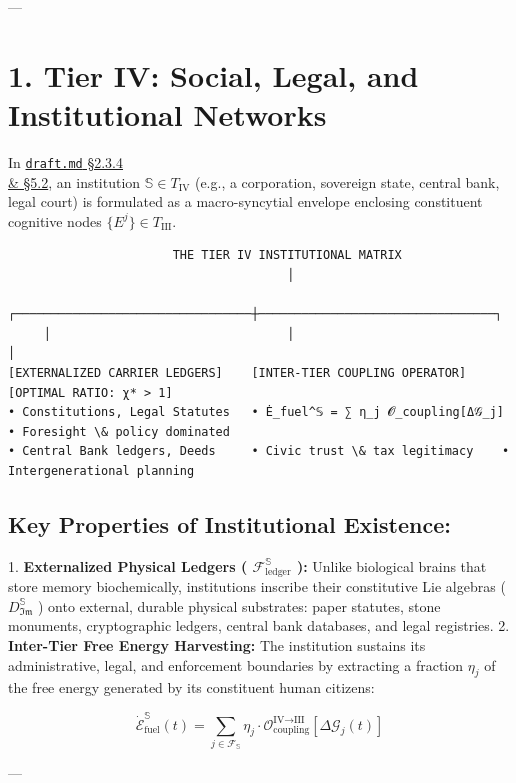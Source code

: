 \documentclass[11pt,a4paper]{article}
\theoremstyle{definition}
\theoremstyle{remark}
\begin{document}
---

\section{1. Tier IV: Social, Legal, and Institutional Networks}

In \href{../existence/draft.md}{\texttt{draft.md} \S 2.3.4 \\& \S 5.2}, an institution $\mathbb{S} \in T_{\text{IV}}$ (e.g., a corporation, sovereign state, central bank, legal court) is formulated as a macro-syncytial envelope enclosing constituent cognitive nodes $\{E^j\} \in T_{\text{III}}$.

\begin{verbatim}
                       THE TIER IV INSTITUTIONAL MATRIX
                                       │
     ┌─────────────────────────────────┼─────────────────────────────────┐
     │                                 │                                 │
[EXTERNALIZED CARRIER LEDGERS]    [INTER-TIER COUPLING OPERATOR]    [OPTIMAL RATIO: χ* > 1]
• Constitutions, Legal Statutes   • Ė_fuel^𝕊 = ∑ η_j 𝓞_coupling[Δ𝒢_j] • Foresight \& policy dominated
• Central Bank ledgers, Deeds     • Civic trust \& tax legitimacy    • Intergenerational planning
\end{verbatim}

\subsection{Key Properties of Institutional Existence:}
1. \textbf{Externalized Physical Ledgers ( $\mathcal{F}_{\text{ledger}}^{\mathbb{S}}$ ):}
Unlike biological brains that store memory biochemically, institutions inscribe their constitutive Lie algebras ( $D_{\mathfrak{Im}}^{\mathbb{S}}$ ) onto external, durable physical substrates: paper statutes, stone monuments, cryptographic ledgers, central bank databases, and legal registries.
2. \textbf{Inter-Tier Free Energy Harvesting:}
The institution sustains its administrative, legal, and enforcement boundaries by extracting a fraction $\eta_j$ of the free energy generated by its constituent human citizens:


\begin{equation}
\dot{\mathcal{E}}_{\text{fuel}}^{\mathbb{S}}(t) = \sum_{j \in \mathcal{F}_{\mathbb{S}}} \eta_j \cdot \mathcal{O}_{\text{coupling}}^{\text{IV} \to \text{III}}[ \Delta \mathcal{G}_j(t) ]
\end{equation}


---
\end{document}
